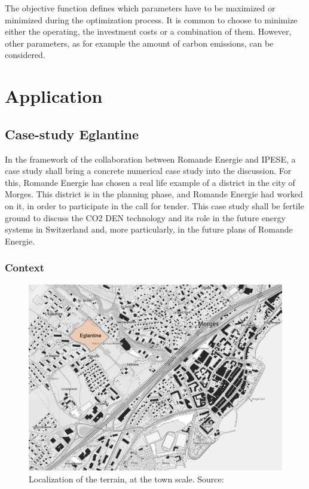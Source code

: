 \documentclass{article}
\begin{document}
The objective function defines which parameters have to be maximized or minimized during the optimization process. It is common to choose to minimize either the operating, the investment costs or a combination of them. However, other parameters, as for example the amount of carbon emissions, can be considered.



\newpage
\section{Application}

\subsection{Case-study Eglantine}\label{ss:Eglantine}
In the framework of the collaboration between Romande Energie and IPESE, a case study shall bring a concrete numerical case study into the discussion. For this, Romande Energie has chosen a real life example of a district in the city of Morges. This district is in the planning phase, and Romande Energie had worked on it, in order to participate in the call for tender. This case study shall be fertile ground to discuss the CO2 DEN technology and its role in the future energy systems in Switzerland and, more particularly, in the future plans of Romande Energie.

\subsubsection{Context}

\begin{figure}[htp]
\centering
\includegraphics[width=1\textwidth]{morges.png}
\caption{Localization of the terrain, at the town scale. Source:~\cite{GuichetCartographiqueEtat}}
\label{fig:morges}
\end{figure}
\end{document}

